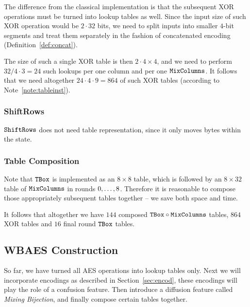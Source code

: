 	The difference from the classical implementation is that the subsequent XOR operations must be turned into lookup tables as well. Since the input size of such XOR operation would be $2\cdot 32$ bits, we need to split inputs into smaller $4$-bit segments and treat them separately in the fashion of concatenated encoding (Definition~\ref{def:concat}).
	
	The size of such a single XOR table is then $2\cdot 4\times 4$, and we need to perform $32/4\cdot 3=24$ such lookups per one column and per one $\texttt{MixColumns}$. It follows that we need altogether $24\cdot 4\cdot 9 = 864$ of such XOR tables (according to Note~\ref{note:tableinst}).

\subsubsection{ShiftRows}
	
	$\texttt{ShiftRows}$ does not need table representation, since it only moves bytes within the state.

\subsubsection{Table Composition}
	
	Note that $\texttt{TBox}$ is implemented as an $8\times 8$ table, which is followed by an $8\times 32$ table of $\texttt{MixColumns}$ in rounds $0 , \ldots , 8$. Therefore it is reasonable to compose those appropriately subsequent tables together -- we save both space and time.
	
	It follows that altogether we have $144$ composed $\texttt{TBox}\circ\texttt{MixColumns}$ tables, $864$ XOR tables and $16$ final round $\texttt{TBox}$ tables.



\subsection{WBAES Construction}
\label{sec:constrwbaes}

So far, we have turned all AES operations into lookup tables only. Next we will incorporate encodings as described in Section~\ref{sec:encod}, these encodings will play the role of a confusion feature. Then introduce a diffusion feature called {\em Mixing Bijection}, and finally compose certain tables together.

